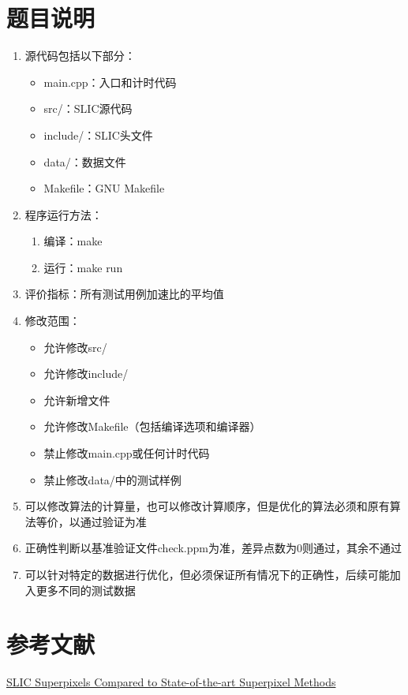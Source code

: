 \documentclass{ctexart}
\begin{document}
\section{题目说明}
\begin{enumerate}
    \item 源代码包括以下部分：
    \begin{itemize}
        \item main.cpp：入口和计时代码
        \item src/：SLIC源代码
        \item include/：SLIC头文件
        \item data/：数据文件
        \item Makefile：GNU Makefile
    \end{itemize}
    \item 程序运行方法：
    \begin{enumerate}
        \item 编译：make
        \item 运行：make run
    \end{enumerate}
    \item 评价指标：所有测试用例加速比的平均值
    \item 修改范围：
    \begin{itemize}
        \item 允许修改src/
        \item 允许修改include/
        \item 允许新增文件
        \item 允许修改Makefile（包括编译选项和编译器）
        \item 禁止修改main.cpp或任何计时代码
        \item 禁止修改data/中的测试样例
    \end{itemize}
    \item 可以修改算法的计算量，也可以修改计算顺序，但是优化的算法必须和原有算法等价，以通过验证为准
    \item 正确性判断以基准验证文件check.ppm为准，差异点数为0则通过，其余不通过
    \item 可以针对特定的数据进行优化，但必须保证所有情况下的正确性，后续可能加入更多不同的测试数据
\end{enumerate}

\section{参考文献}

\href{https://core.ac.uk/download/pdf/147983593.pdf}{SLIC Superpixels Compared to State-of-the-art
Superpixel Methods}
\end{document}
